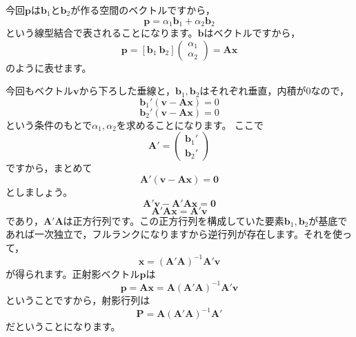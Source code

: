 \documentclass{ltjsbook}
\begin{document}
今回$\bm{p}$は$\bm{b}_1$と$\bm{b}_2$が作る空間のベクトルですから，
\[ \bm{p} = \alpha_1 \bm{b}_1+\alpha_2 \bm{b}_2 \]
という線型結合で表されることになります。$\bm{b}$はベクトルですから，
\[\bm{p} = [\bm{b}_1　\  \bm{b}_2]\begin{pmatrix}\alpha_1\\\alpha_2\end{pmatrix} = \bm{Ax}\]
のように表せます。

今回もベクトル$\bm{v}$から下ろした垂線と，$\bm{b}_1,\bm{b}_2$はそれぞれ垂直，内積が0なので，
\[ \bm{b}_1'(\bm{v} - \bm{Ax}) = 0 \]
\[ \bm{b}_2'(\bm{v} - \bm{Ax}) = 0 \]
という条件のもとで$\alpha_1,\alpha_2$を求めることになります。
ここで
\[ \bm{A}' = \begin{pmatrix}\bm{b}_1' \\\bm{b}_2' \end{pmatrix} \]
ですから，まとめて
\[ \bm{A}'(\bm{v}-\bm{Ax}) = \bm{0} \]
としましょう。
\[ \bm{A}'\bm{v} - \bm{A}'\bm{Ax} = \bm{0} \]
\[ \bm{A}'\bm{Ax} = \bm{A}'\bm{v} \]
であり，$\bm{A}'\bm{A}$は正方行列です。この正方行列を構成していた要素$\bm{b}_1,\bm{b}_2$が基底であれば一次独立で，フルランクになりますから逆行列が存在します。それを使って，
\[ \bm{x} = (\bm{A}'\bm{A})^{-1}\bm{A}'\bm{v} \]
が得られます。正射影ベクトル$\bm{p}$は
\[ \bm{p} = \bm{Ax} = \bm{A}(\bm{A}'\bm{A})^{-1}\bm{A}'\bm{v} \]
ということですから，射影行列は
\[ \bm{P} = \bm{A}(\bm{A}'\bm{A})^{-1}\bm{A}'\]
だということになります。
\end{document}
